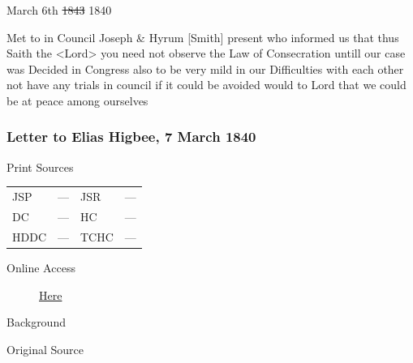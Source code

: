 					March 6th \sout{1843} 1840
					
					Met to in Council Joseph \& Hyrum [Smith] present who informed us that thus Saith the <Lord> you need not observe the Law of Consecration untill our case was Decided in Congress also to be very mild in our Difficulties with each other not have any trials in council if it could be avoided would to Lord that we could be at peace among ourselves
					
		\subsubsection{Letter to Elias Higbee, 7 March 1840}
			\label{EMS-1840-JS-7-MAR-1840}
			
			\begin{description}
				\item[Print Sources]
			\end{description}

			\begin{tabular}{p{0.5in}p{1in}p{0.5in}p{1in}}
				JSP	 	& ---		& JSR 		& --- \\
				DC	 	& ---		& HC 		& --- \\
				HDDC 	& ---		& TCHC 		& --- \\
			\end{tabular}
			
			\begin{description}
				\item[Online Access] \href{https://www.josephsmithpapers.org/paper-summary/letter-to-elias-higbee-7-march-1840/1}{Here}
			\end{description}
			
			\begin{description}
				\item[Background]
			\end{description}
			
			
			\begin{description}
				\item[Original Source]
			\end{description}
			
